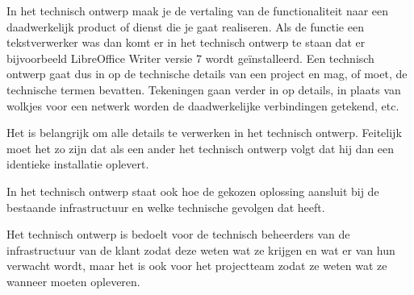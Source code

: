 
In het technisch ontwerp maak je de vertaling van de functionaliteit naar een daadwerkelijk product of dienst die je gaat realiseren. Als de functie een tekstverwerker was dan komt er in het technisch ontwerp te staan dat er bijvoorbeeld LibreOffice Writer versie 7 wordt ge\"installeerd. Een technisch ontwerp gaat dus in op de technische details van een project en mag, of moet, de technische termen bevatten. Tekeningen gaan verder in op details, in plaats van wolkjes voor een netwerk worden de daadwerkelijke verbindingen getekend, etc.

Het is belangrijk om alle details te verwerken in het technisch ontwerp. Feitelijk moet het zo zijn dat als een ander het technisch ontwerp volgt dat hij dan een identieke installatie oplevert.

In het technisch ontwerp staat ook hoe de gekozen oplossing aansluit bij de bestaande infrastructuur en welke technische gevolgen dat heeft.

Het technisch ontwerp is bedoelt voor de technisch beheerders van de infrastructuur van de klant zodat deze weten wat ze krijgen en wat er van hun verwacht wordt, maar het is ook voor het projectteam zodat ze weten wat ze wanneer moeten opleveren.
